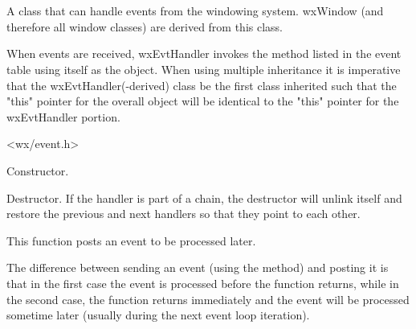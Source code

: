 \section{}\label{wxevthandler}

A class that can handle events from the windowing system.
wxWindow (and therefore all window classes) are derived from
this class.

When events are received, wxEvtHandler invokes the method listed in the
event table using itself as the object.  When using multiple inheritance
it is imperative that the wxEvtHandler(-derived) class be the first
class inherited such that the "this" pointer for the overall object
will be identical to the "this" pointer for the wxEvtHandler portion.




<wx/event.h>




\label{wxevthandlerctor}


Constructor.

\label{wxevthandlerdtor}


Destructor. If the handler is part of a chain, the destructor will
unlink itself and restore the previous and next handlers so that they point to
each other.

\label{wxevthandleraddpendingevent}


This function posts an event to be processed later.




The difference between sending an event (using the
 method) and posting it is
that in the first case the event is processed before the function returns,
while in the second case, the function returns immediately and the event will
be processed sometime later (usually during the next event loop iteration).

